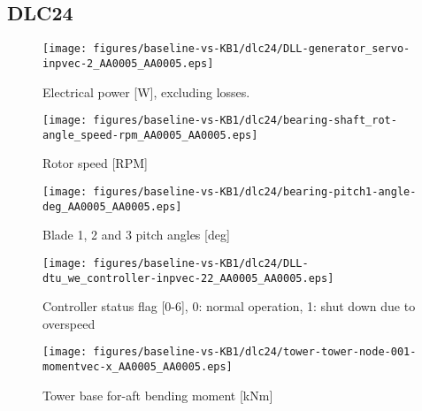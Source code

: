 
\subsection{DLC24}
\label{sec:baseline-vs-KB1:dlc24}

\begin{figure}[!ht]
\begin{center}
	\texttt{[image: figures/baseline-vs-KB1/dlc24/DLL-generator\_servo-inpvec-2\_AA0005\_AA0005.eps]}
\end{center}
\caption{Electrical power [W], excluding losses.}
\label{fig:baseline-vs-KB1:dlc24:power}
\end{figure}

\begin{figure}[!ht]
\begin{center}
	\texttt{[image: figures/baseline-vs-KB1/dlc24/bearing-shaft\_rot-angle\_speed-rpm\_AA0005\_AA0005.eps]}
\end{center}
\caption{Rotor speed [RPM]}
\label{fig:baseline-vs-KB1:dlc24:rpm}
\end{figure}

\begin{figure}[!ht]
\begin{center}
	\texttt{[image: figures/baseline-vs-KB1/dlc24/bearing-pitch1-angle-deg\_AA0005\_AA0005.eps]}
\end{center}
\caption{Blade 1, 2 and 3 pitch angles [deg]}
\label{fig:baseline-vs-KB1:dlc24:pitch}
\end{figure}

\begin{figure}[!ht]
\begin{center}
	\texttt{[image: figures/baseline-vs-KB1/dlc24/DLL-dtu\_we\_controller-inpvec-22\_AA0005\_AA0005.eps]}
\end{center}
\caption{Controller status flag [0-6], 0: normal operation, 1: shut down due to overspeed}
\label{fig:baseline-vs-KB1:dlc24:status}
\end{figure}

\begin{figure}[!ht]
\begin{center}
	\texttt{[image: figures/baseline-vs-KB1/dlc24/tower-tower-node-001-momentvec-x\_AA0005\_AA0005.eps]}
\end{center}
\caption{Tower base for-aft bending moment [kNm]}
\label{fig:baseline-vs-KB1:dlc24:tower-base-fa}
\end{figure}

